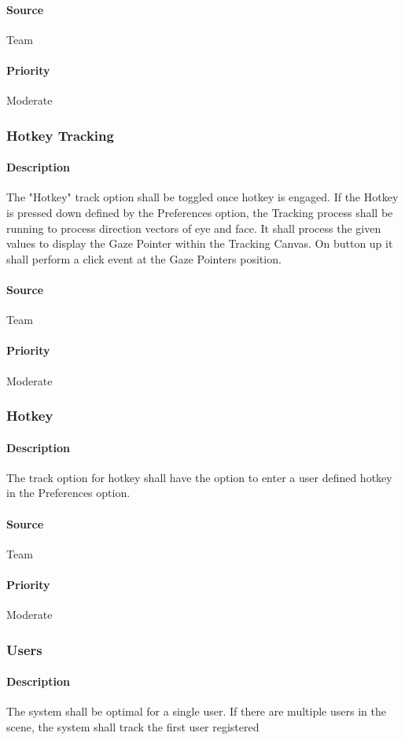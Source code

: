 \paragraph{Source}
Team
\paragraph{Priority}
Moderate
\subsubsection{Hotkey Tracking}
\paragraph{Description}
The "Hotkey" track option shall be toggled once hotkey is engaged.  If the Hotkey is pressed down defined by the Preferences option, the Tracking process shall be running to process direction vectors of eye and face. It shall process the given values to display the Gaze Pointer within the Tracking Canvas. On button up it shall perform a click event at the Gaze Pointers position.
\paragraph{Source}
Team
\paragraph{Priority}
Moderate
\subsubsection{Hotkey}
\paragraph{Description}
The track option for hotkey shall have the option to enter a user defined hotkey in the Preferences option.
\paragraph{Source}
Team
\paragraph{Priority}
Moderate
\subsubsection{Users}
\paragraph{Description}
The system shall be optimal for a single user.  If there are multiple users in the scene, the system shall track the first user registered
